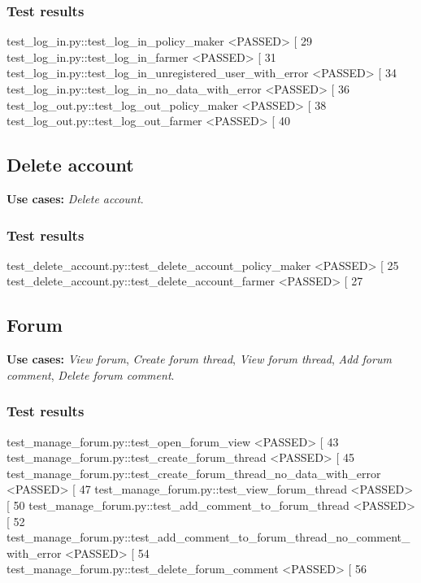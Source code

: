 \subsubsection*{Test results}
\begin{verbnobox}[\footnotesize \vbdelim]
test_log_in.py::test_log_in_policy_maker <PASSED>                          [ 29%
test_log_in.py::test_log_in_farmer <PASSED>                                [ 31%
test_log_in.py::test_log_in_unregistered_user_with_error <PASSED>          [ 34%
test_log_in.py::test_log_in_no_data_with_error <PASSED>                    [ 36%
test_log_out.py::test_log_out_policy_maker <PASSED>                        [ 38%
test_log_out.py::test_log_out_farmer <PASSED>                              [ 40%
\end{verbnobox}

\subsection{Delete account}

\textbf{Use cases:} \textit{Delete account}.

\subsubsection*{Test results}
\begin{verbnobox}[\footnotesize \vbdelim]
test_delete_account.py::test_delete_account_policy_maker <PASSED>          [ 25%
test_delete_account.py::test_delete_account_farmer <PASSED>                [ 27%
\end{verbnobox}

\subsection{Forum}

\textbf{Use cases:} \textit{View forum}, \textit{Create forum thread}, \textit{View forum thread}, \textit{Add forum comment}, \textit{Delete forum comment}.

\subsubsection*{Test results}
\begin{verbnobox}[\footnotesize \vbdelim]
test_manage_forum.py::test_open_forum_view <PASSED>                                   [ 43%
test_manage_forum.py::test_create_forum_thread <PASSED>                               [ 45%
test_manage_forum.py::test_create_forum_thread_no_data_with_error <PASSED>            [ 47%
test_manage_forum.py::test_view_forum_thread <PASSED>                                 [ 50%
test_manage_forum.py::test_add_comment_to_forum_thread <PASSED>                       [ 52%
test_manage_forum.py::test_add_comment_to_forum_thread_no_comment_with_error <PASSED> [ 54%
test_manage_forum.py::test_delete_forum_comment <PASSED>                              [ 56%
\end{verbnobox}


